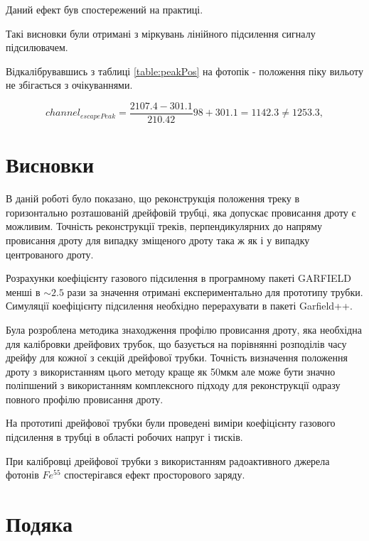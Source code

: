 \documentclass[pdftex,14pt]{scrartcl}
\begin{document}
	Даний ефект був спостережений на практиці.

	Такі висновки були отримані  з міркувань лінійного підсилення сигналу підсилювачем.
	

	Відкалібрувавшись з таблиці \ref{table:peakPos} на фотопік - положення піку вильоту не збігається з очікуваннями.
	
	\begin{equation}
			channel_{escapePeak} = \frac{2107.4 - 301.1}{210.42} 98 + 301.1 = 1142.3 \ne 1253.3,
	\end{equation}
	
	
	\section{ Висновки}
	
	В даній роботі було показано, що реконструкція положення треку в горизонтально розташованій дрейфовій трубці, яка допускає провисання дроту є можливим. Точність реконструкції треків, перпендикулярних до напряму провисання дроту для випадку зміщеного дроту така ж як і  у випадку центрованого дроту.
	
	Розрахунки коефіцієнту газового підсилення в програмному пакеті GARFIELD менші в $\sim 2.5$ рази за значення отримані експериментально для прототипу трубки. Симуляції коефіцієнту підсилення необхідно перерахувати в пакеті Garfield++. 
	
	Була розроблена методика знаходження профілю провисання дроту, яка необхідна для калібровки дрейфових трубок, що базується на порівнянні розподілів часу дрейфу для кожної з секцій дрейфової трубки. Точність визначення положення дроту з використанням цього методу краще як 50мкм але може бути значно поліпшений з використанням комплексного підходу для реконструкції одразу повного профілю провисання дроту.
	
	На прототипі дрейфової трубки були проведені виміри коефіцієнту газового підсилення в трубці в області робочих напруг і тисків. 
	
	При калібровці дрейфової трубки з використанням радоактивного джерела фотонів $Fe^{55}$ спостерігався ефект просторового заряду.
	
\section{ Подяка}
\end{document}
